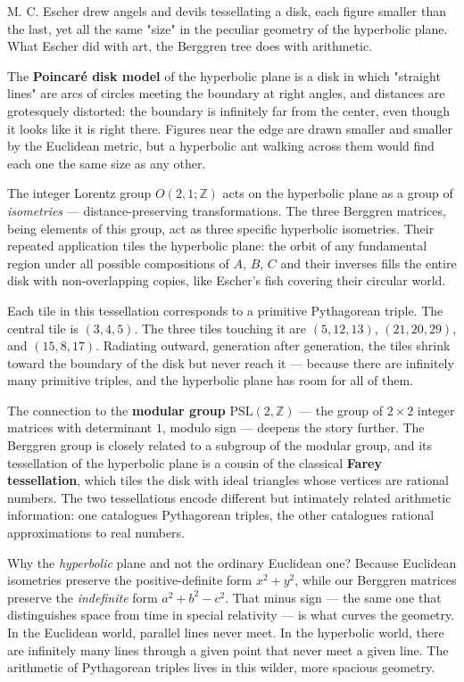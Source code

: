 M. C. Escher drew angels and devils tessellating a disk, each figure smaller than the last, yet all the same "size" in the peculiar geometry of the hyperbolic plane. What Escher did with art, the Berggren tree does with arithmetic.

The \textbf{Poincar\'e disk model} of the hyperbolic plane is a disk in which "straight lines" are arcs of circles meeting the boundary at right angles, and distances are grotesquely distorted: the boundary is infinitely far from the center, even though it looks like it is right there. Figures near the edge are drawn smaller and smaller by the Euclidean metric, but a hyperbolic ant walking across them would find each one the same size as any other.

The integer Lorentz group $O(2,1; \mathbb{Z})$ acts on the hyperbolic plane as a group of \textit{isometries} --- distance-preserving transformations. The three Berggren matrices, being elements of this group, act as three specific hyperbolic isometries. Their repeated application tiles the hyperbolic plane: the orbit of any fundamental region under all possible compositions of $A$, $B$, $C$ and their inverses fills the entire disk with non-overlapping copies, like Escher's fish covering their circular world.

Each tile in this tessellation corresponds to a primitive Pythagorean triple. The central tile is $(3, 4, 5)$. The three tiles touching it are $(5, 12, 13)$, $(21, 20, 29)$, and $(15, 8, 17)$. Radiating outward, generation after generation, the tiles shrink toward the boundary of the disk but never reach it --- because there are infinitely many primitive triples, and the hyperbolic plane has room for all of them.

The connection to the \textbf{modular group} $\text{PSL}(2, \mathbb{Z})$ --- the group of $2 \times 2$ integer matrices with determinant $1$, modulo sign --- deepens the story further. The Berggren group is closely related to a subgroup of the modular group, and its tessellation of the hyperbolic plane is a cousin of the classical \textbf{Farey tessellation}, which tiles the disk with ideal triangles whose vertices are rational numbers. The two tessellations encode different but intimately related arithmetic information: one catalogues Pythagorean triples, the other catalogues rational approximations to real numbers.

Why the \textit{hyperbolic} plane and not the ordinary Euclidean one? Because Euclidean isometries preserve the positive-definite form $x^2 + y^2$, while our Berggren matrices preserve the \textit{indefinite} form $a^2 + b^2 - c^2$. That minus sign --- the same one that distinguishes space from time in special relativity --- is what curves the geometry. In the Euclidean world, parallel lines never meet. In the hyperbolic world, there are infinitely many lines through a given point that never meet a given line. The arithmetic of Pythagorean triples lives in this wilder, more spacious geometry.

